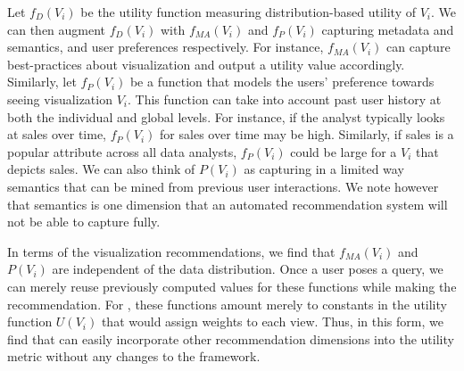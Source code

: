 Let $f_D (V_i)$ be the utility function measuring distribution-based utility of $V_i$.
We can then augment $f_D (V_i)$ with $f_{MA}(V_i)$ and $f_P (V_i)$ capturing metadata and semantics, and user preferences respectively.
For instance, $f_{MA}(V_i)$ can capture best-practices about visualization and output a utility value accordingly.
Similarly, let $f_P (V_i)$ be a function that models the users' preference towards seeing visualization $V_i$. 
This function can take into account past user history at both the individual and global levels.
For instance, if the analyst typically looks at sales over time, $f_P (V_i)$ for sales over time
may be high.
Similarly, if sales is a popular attribute across all data analysts, $f_P (V_i)$ could be large for
a $V_i$ that depicts sales.
We can also think of $P (V_i)$ as capturing in a limited way semantics that can be mined from previous user interactions.
We note however that semantics is one dimension that an automated recommendation system will not be able to capture fully.

In terms of the visualization recommendations, we find that $f_{MA}(V_i)$ and $P (V_i)$ are independent
of the data distribution.
Once a user poses a query, we can merely reuse previously computed values for these functions while
making the recommendation.
For \SeeDB, these functions amount merely to constants in the utility function $U (V_i)$ that would assign weights to each view.
Thus, in this form, we find that \SeeDB can easily incorporate other recommendation dimensions into
the utility metric without any changes to the \SeeDB framework.





